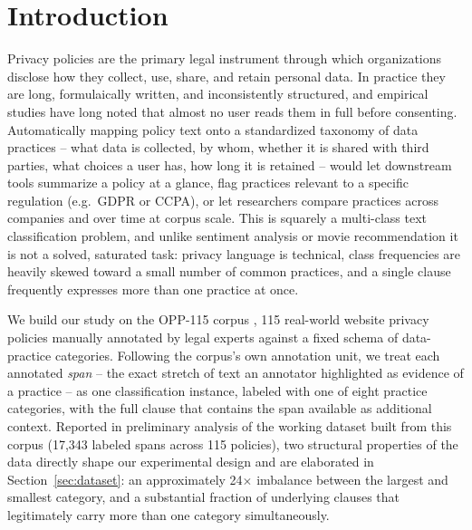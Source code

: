 \documentclass[11pt]{acl}
\begin{document}
\section{Introduction}
\label{sec:intro}

Privacy policies are the primary legal instrument through which organizations disclose
how they collect, use, share, and retain personal data. In practice they are long,
formulaically written, and inconsistently structured, and empirical studies have long
noted that almost no user reads them in full before consenting. Automatically mapping
policy text onto a standardized taxonomy of data practices -- what data is collected, by
whom, whether it is shared with third parties, what choices a user has, how long it is
retained -- would let downstream tools summarize a policy at a glance, flag practices
relevant to a specific regulation (e.g.\ GDPR or CCPA), or let researchers compare
practices across companies and over time at corpus scale. This is squarely a
multi-class text classification problem, and unlike sentiment analysis or movie
recommendation it is not a solved, saturated task: privacy language is technical, class
frequencies are heavily skewed toward a small number of common practices, and a single
clause frequently expresses more than one practice at once.

We build our study on the OPP-115 corpus \cite{wilson-etal-2016-creation}, 115 real-world
website privacy policies manually annotated by legal experts against a fixed schema of
data-practice categories. Following the corpus's own annotation unit, we treat each
annotated \emph{span} -- the exact stretch of text an annotator highlighted as evidence
of a practice -- as one classification instance, labeled with one of eight practice
categories, with the full clause that contains the span available as additional context.
Reported in preliminary analysis of the working dataset built from this corpus (17,343
labeled spans across 115 policies), two structural properties of the data directly shape
our experimental design and are elaborated in Section~\ref{sec:dataset}: an
approximately 24$\times$ imbalance between the largest and smallest category, and a
substantial fraction of underlying clauses that legitimately carry more than one
category simultaneously.
\end{document}

